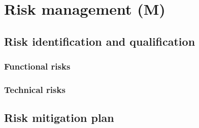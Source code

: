\section{Risk management (M)}
\label{sec:risk-management}
\subsection{Risk identification and qualification}
\subsubsection{Functional risks}
\lipsum[1]
\subsubsection{Technical risks}
\lipsum[1]
\subsection{Risk mitigation plan}
\lipsum[1]
